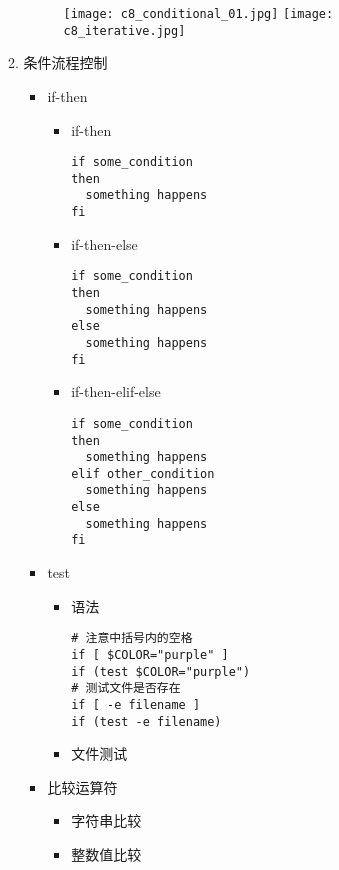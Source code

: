 \documentclass{TIJMUjiaoanLL}
\begin{document}
\begin{enumerate}
\begin{enumerate}
    \vspace*{-10pt}
    \begin{figure}[h]
      \centering
      \texttt{[image: c8\_conditional\_01.jpg]}
      \quad
      \texttt{[image: c8\_iterative.jpg]}
    \end{figure}
    \vspace*{-10pt}


\otherTail
\newpage
\otherHeader


      \item 条件流程控制
	\begin{itemize}
	  \item if-then
	    \begin{itemize}
	      \item if-then
\begin{verbatim}
if some_condition
then
  something happens
fi
\end{verbatim}
	      \item if-then-else
\begin{verbatim}
if some_condition
then
  something happens
else
  something happens
fi
\end{verbatim}
	      \item if-then-elif-else
\begin{verbatim}
if some_condition
then
  something happens
elif other_condition
  something happens
else
  something happens
fi
\end{verbatim}
	    \end{itemize}

	  \item test
	    \begin{itemize}
	      \item 语法
\begin{verbatim}
# 注意中括号内的空格
if [ $COLOR="purple" ]
if (test $COLOR="purple")
# 测试文件是否存在
if [ -e filename ]
if (test -e filename)
\end{verbatim}
	      \item 文件测试
	    \end{itemize}

	  \item 比较运算符
	    \begin{itemize}
	      \item 字符串比较
	      \item 整数值比较
	    \end{itemize}


\end{itemize}
\end{enumerate}
\end{enumerate}
\end{document}
